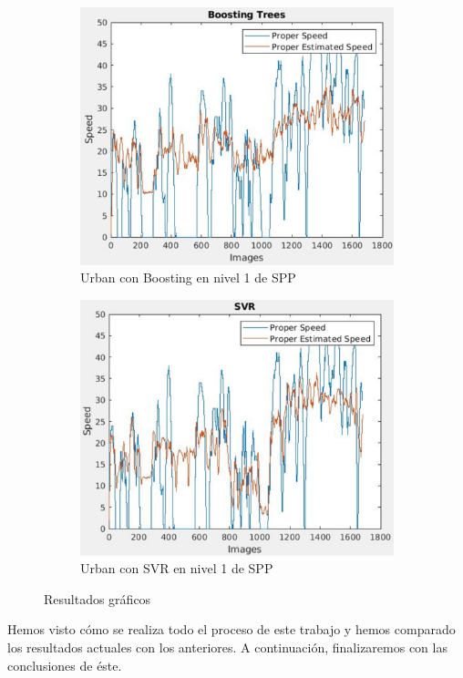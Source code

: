 \begin{figure}[H]
\begin{subfigure}[b]{0.45\linewidth}
    \includegraphics[width=\linewidth]{Figuras/Boosting_Urban(Nivel_1).eps}
    \caption{Urban con Boosting en nivel 1 de \ac{SPP}}
  \end{subfigure}
      \begin{subfigure}[b]{0.45\linewidth}
    \includegraphics[width=\linewidth]{Figuras/SVR_Urban(Nivel_1).eps}
    \caption{Urban con SVR en nivel 1 de \ac{SPP}}
  \end{subfigure}
  \caption{Resultados gráficos}
\end{figure}

Hemos visto cómo se realiza todo el proceso de este trabajo y hemos comparado los resultados actuales con los anteriores. A continuación, finalizaremos con las conclusiones de éste.